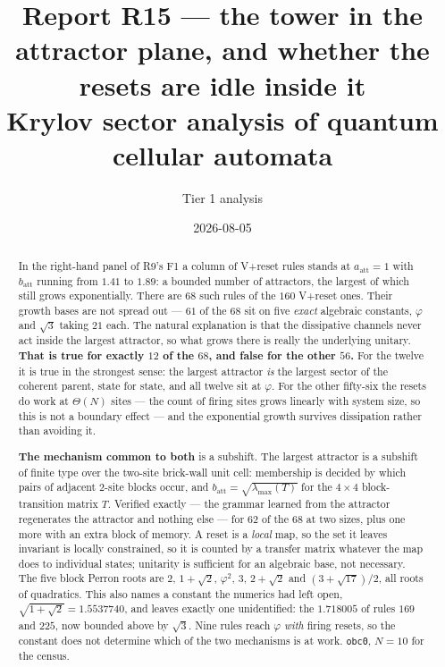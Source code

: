 \documentclass[11pt]{article}
\title{\textbf{Report R15 --- the tower in the attractor plane, and whether the
resets are idle inside it}\\
\large Krylov sector analysis of quantum cellular automata}
\author{Tier 1 analysis}
\date{2026-08-05}
\newcommand{\rt}[1]{\texttt{#1}}
\newcommand{\att}{\mathrm{att}}
\begin{document}
\maketitle

\begin{abstract}
In the right-hand panel of R9's F1 a column of V+reset rules stands at
$a_\att=1$ with $b_\att$ running from $1.41$ to $1.89$: a bounded number of
attractors, the largest of which still grows exponentially. There are $68$ such
rules of the $160$ V+reset ones. Their growth bases are not spread out --- $61$
of the $68$ sit on five \emph{exact} algebraic constants, $\varphi$ and $\sqrt3$
taking $21$ each. The natural explanation is that the dissipative channels never
act inside the largest attractor, so what grows there is really the underlying
unitary. \textbf{That is true for exactly $12$ of the $68$, and false for the
other $56$.} For the twelve it is true in the strongest sense: the largest
attractor \emph{is} the largest sector of the coherent parent, state for state,
and all twelve sit at $\varphi$. For the other fifty-six the resets do work at
$\Theta(N)$ sites --- the count of firing sites grows linearly with system size,
so this is not a boundary effect --- and the exponential growth survives
dissipation rather than avoiding it.

\textbf{The mechanism common to both} is a subshift. The largest attractor is a
subshift of finite type over the two-site brick-wall unit cell: membership is
decided by which pairs of adjacent $2$-site blocks occur, and
$b_\att=\sqrt{\lambda_{\max}(T)}$ for the $4\times4$ block-transition matrix
$T$. Verified exactly --- the grammar learned from the attractor regenerates the
attractor and nothing else --- for $62$ of the $68$ at two sizes, plus one more
with an extra block of memory. A reset is a \emph{local} map, so the set it
leaves invariant is locally constrained, so it is counted by a transfer matrix
whatever the map does to individual states; unitarity is sufficient for an
algebraic base, not necessary. The five block Perron roots are
$2$, $1+\sqrt2$, $\varphi^2$, $3$, $2+\sqrt2$ and $(3+\sqrt{17})/2$, all roots
of quadratics. This also names a constant the numerics had left open,
$\sqrt{1+\sqrt2}=1.5537740$, and leaves exactly one unidentified: the $1.718005$
of rules $169$ and $225$, now bounded above by $\sqrt3$. Nine rules reach
$\varphi$ \emph{with} firing resets, so the constant does not determine which
of the two mechanisms is at work. \rt{obc0}, $N=10$ for the census.
\end{abstract}
\end{document}
